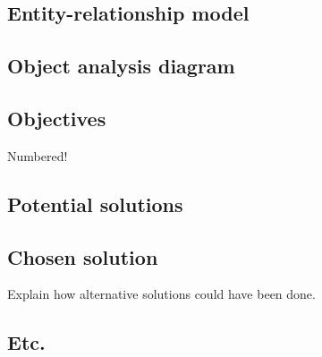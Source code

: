 \subsection{Entity-relationship model}
\lipsum
\subsection{Object analysis diagram}
\lipsum
\subsection{Objectives}

Numbered!

\subsection{Potential solutions}
\lipsum
\subsection{Chosen solution}

Explain how alternative solutions could have been done.

\subsection{Etc.}
\lipsum
